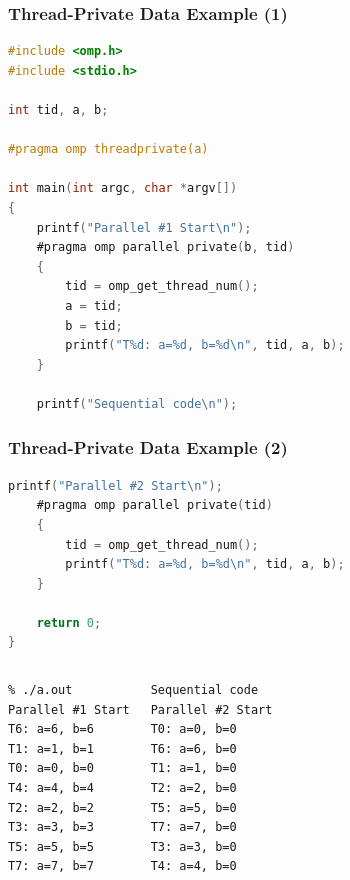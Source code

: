 \begin{frame}[fragile]
  \frametitle{Thread-Private Data Example (1)}

\large
\begin{changemargin}{1cm}
  \begin{lstlisting}[language=C,morekeywords={foreach,pragma,omp,parallel,single,nowait,task,untied,barrier,taskyield}]
#include <omp.h>
#include <stdio.h>

int tid, a, b;

#pragma omp threadprivate(a)

int main(int argc, char *argv[])
{
    printf("Parallel #1 Start\n");
    #pragma omp parallel private(b, tid)
    {
        tid = omp_get_thread_num();
        a = tid;
        b = tid;
        printf("T%d: a=%d, b=%d\n", tid, a, b);
    }

    printf("Sequential code\n");
  \end{lstlisting}
  
\end{changemargin}

\end{frame}

\begin{frame}[fragile]
  \frametitle{Thread-Private Data Example (2)}

  
\large
\begin{changemargin}{1cm}
  \begin{lstlisting}[language=C,morekeywords={foreach,pragma,omp,parallel,single,nowait,task,untied,barrier,taskyield}]
    printf("Parallel #2 Start\n");
    #pragma omp parallel private(tid)
    {
        tid = omp_get_thread_num();
        printf("T%d: a=%d, b=%d\n", tid, a, b);
    }

    return 0;
}    
  \end{lstlisting}
\end{changemargin}
  
  \begin{center}
    \begin{columns}[c]
      \column{1.5in}
        \begin{lstlisting}
% ./a.out
Parallel #1 Start
T6: a=6, b=6
T1: a=1, b=1
T0: a=0, b=0
T4: a=4, b=4
T2: a=2, b=2
T3: a=3, b=3
T5: a=5, b=5
T7: a=7, b=7
        \end{lstlisting}
      \column{1.5in}
        \begin{lstlisting}
Sequential code
Parallel #2 Start
T0: a=0, b=0
T6: a=6, b=0
T1: a=1, b=0
T2: a=2, b=0
T5: a=5, b=0
T7: a=7, b=0
T3: a=3, b=0
T4: a=4, b=0
        \end{lstlisting}
    \end{columns}
  \end{center}
\end{frame}

